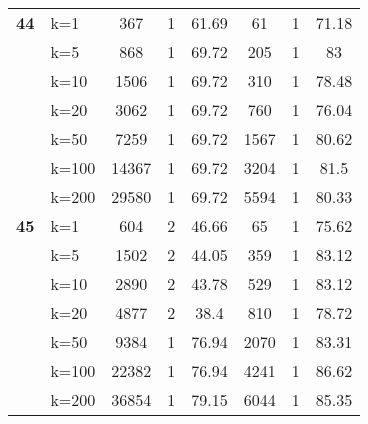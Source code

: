 \begin{table}[htbp]
\begin{tabular}{|l|l|c|c|c|c|c|c|}
    \multicolumn{1}{|r|}{\textbf{44}} & k=1 & 367 & 1 & 61.69 & 61 & 1 & 71.18 \\ 
     & k=5 & 868 & 1 & 69.72 & 205 & 1 & 83 \\ 
     & k=10 & 1506 & 1 & 69.72 & 310 & 1 & 78.48 \\ 
     & k=20 & 3062 & 1 & 69.72 & 760 & 1 & 76.04 \\ 
     & k=50 & 7259 & 1 & 69.72 & 1567 & 1 & 80.62 \\ 
     & k=100 & 14367 & 1 & 69.72 & 3204 & 1 & 81.5 \\ 
     & k=200 & 29580 & 1 & 69.72 & 5594 & 1 & 80.33 \\ \hline
    \multicolumn{1}{|r|}{\textbf{45}} & k=1 & 604 & 2 & 46.66 & 65 & 1 & 75.62 \\ 
     & k=5 & 1502 & 2 & 44.05 & 359 & 1 & 83.12 \\ 
     & k=10 & 2890 & 2 & 43.78 & 529 & 1 & 83.12 \\ 
     & k=20 & 4877 & 2 & 38.4 & 810 & 1 & 78.72 \\ 
     & k=50 & 9384 & 1 & 76.94 & 2070 & 1 & 83.31 \\ 
     & k=100 & 22382 & 1 & 76.94 & 4241 & 1 & 86.62 \\ 
     & k=200 & 36854 & 1 & 79.15 & 6044 & 1 & 85.35 \\ \hline
    \end{tabular}
\end{table}
